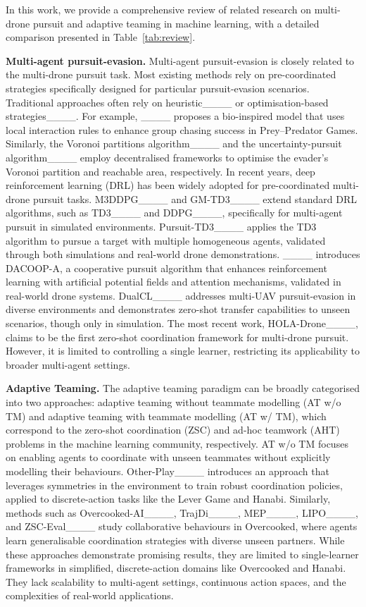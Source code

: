 In this work, we provide a comprehensive review of related research on multi-drone pursuit and adaptive teaming in machine learning, with a detailed comparison presented in Table~\ref{tab:review}.

\textbf{Multi-agent pursuit-evasion. } 
Multi-agent pursuit-evasion is closely related to the multi-drone pursuit task. 
Most existing methods rely on pre-coordinated strategies specifically designed for particular pursuit-evasion scenarios.
Traditional approaches often rely on heuristic____ or optimisation-based strategies____. For example, ____ proposes a bio-inspired model that uses local interaction rules to enhance group chasing success in Prey–Predator Games. Similarly, the Voronoi partitions algorithm____ and the uncertainty-pursuit algorithm____ employ decentralised frameworks to optimise the evader’s Voronoi partition and reachable area, respectively.
In recent years, deep reinforcement learning (DRL) has been widely adopted for pre-coordinated multi-drone pursuit tasks. M3DDPG____ and GM-TD3____ extend standard DRL algorithms, such as TD3____ and DDPG____, specifically for multi-agent pursuit in simulated environments. Pursuit-TD3____ applies the TD3 algorithm to pursue a target with multiple homogeneous agents, validated through both simulations and real-world drone demonstrations. ____ introduces DACOOP-A, a cooperative pursuit algorithm that enhances reinforcement learning with artificial potential fields and attention mechanisms, validated in real-world drone systems. DualCL____ addresses multi-UAV pursuit-evasion in diverse environments and demonstrates zero-shot transfer capabilities to unseen scenarios, though only in simulation.
The most recent work, HOLA-Drone____, claims to be the first zero-shot coordination framework for multi-drone pursuit. However, it is limited to controlling a single learner, restricting its applicability to broader multi-agent settings. 


\textbf{Adaptive Teaming. }The adaptive teaming paradigm can be broadly categorised into two approaches: adaptive teaming without teammate modelling (AT w/o TM) and adaptive teaming with teammate modelling (AT w/ TM), which correspond to the zero-shot coordination (ZSC) and ad-hoc teamwork (AHT) problems in the machine learning community, respectively.
AT w/o TM focuses on enabling agents to coordinate with unseen teammates without explicitly modelling their behaviours. Other-Play____ introduces an approach that leverages symmetries in the environment to train robust coordination policies, applied to discrete-action tasks like the Lever Game and Hanabi. Similarly, methods such as Overcooked-AI____, TrajDi____, MEP____, LIPO____, and ZSC-Eval____ study collaborative behaviours in Overcooked, where agents learn generalisable coordination strategies with diverse unseen partners. While these approaches demonstrate promising results, they are limited to single-learner frameworks in simplified, discrete-action domains like Overcooked and Hanabi. They lack scalability to multi-agent settings, continuous action spaces, and the complexities of real-world applications.

